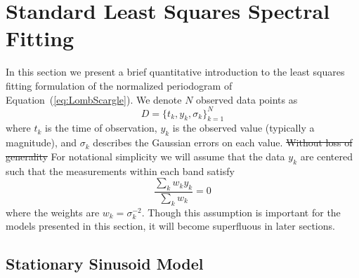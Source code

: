 \documentclass{emulateapj}
\newcommand{\Eq}[1]{Equation~(\ref{eq:#1})}
\newcommand{\eq}[1]{\Eq{#1}}
\newcommand{\eqlabel}[1]{\label{eq:#1}}
\newcommand{\sectlabel}[1]{\label{sect:#1}}
\newcommand{\new}[1]{{\color{red} #1}}
\newcommand{\old}[1]{{\sout{#1}}}
\begin{document}
\section{Standard Least Squares Spectral Fitting}
\sectlabel{standard_least_squares}

In this section we present a brief quantitative introduction to the least squares fitting formulation of the normalized periodogram of \eq{LombScargle}. We denote $N$ observed data points as
\begin{equation}
  D = \{t_k, y_k, \sigma_k\}_{k=1}^N
\end{equation}
where $t_k$ is the time of observation, $y_k$ is the observed value (typically a magnitude), and $\sigma_k$ describes the Gaussian errors on each value. \old{Without loss of generality} \new{For notational simplicity} we will assume that the data $y_k$ are centered such that the measurements within each band satisfy
\begin{equation}
  \eqlabel{ycentered}
  \frac{\sum_k w_ky_k}{\sum_k w_k} = 0
\end{equation}
where the weights are $w_k = \sigma_k^{-2}$.
\new{Though this assumption is important for the models presented in this section, it will become superfluous in later sections.}

\subsection{Stationary Sinusoid Model}
\end{document}
